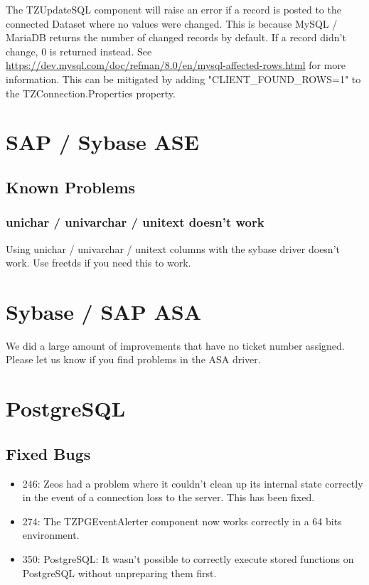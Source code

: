 \documentclass[a4paper,12pt,oneside]{book}
\begin{document}
The TZUpdateSQL component will raise an error if a record is posted to the connected Dataset where no values were changed.
This is because MySQL / MariaDB returns the number of changed records by default.
If a record didn't change, 0 is returned instead.
See \url{https://dev.mysql.com/doc/refman/8.0/en/mysql-affected-rows.html} for more information.
This can be mitigated by adding "CLIENT\_FOUND\_ROWS=1" to the TZConnection.Properties property.

\section{SAP / Sybase ASE}
\label{sec:Rev6_sybase}

\subsection{Known Problems}
\label{sec:Rev6_sybase_KnownProblems}

\subsubsection{unichar / univarchar / unitext doesn't work}
Using unichar / univarchar / unitext columns with the sybase driver doesn't work. Use freetds if you need this to work.

\section{Sybase / SAP ASA}
\label{sec:Rev6_asa}

We did a large amount of improvements that have no ticket number assigned. Please let us know if you find problems in the ASA driver.

\section{PostgreSQL}
\label{sec:Rev6_postgresql}

\subsection{Fixed Bugs}
\label{sec:Rev6_postgresql_FixedBugs}

\begin{itemize}
\item	
  246: Zeos had a problem where it couldn't clean up its internal state correctly in the event of a connection loss to the server.
	This has been fixed.
\item	
  274: The TZPGEventAlerter component now works correctly in a 64 bits environment.
\item
  350: PostgreSQL: It wasn't possible to correctly execute stored functions on PostgreSQL without unpreparing them first.
\end{itemize}
\end{document}
